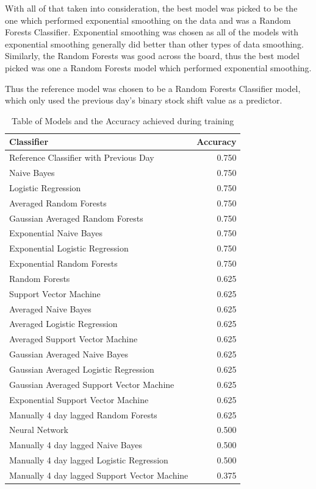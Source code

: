 With all of that taken into consideration, the best model was picked to be the one which performed exponential smoothing on the data and was a Random Forests Classifier. Exponential smoothing was chosen as all of the models with exponential smoothing generally did better than other types of data smoothing. Similarly, the Random Forests was good across the board, thus the best model picked was one a Random Forests model which performed exponential smoothing. 

Thus the reference model was chosen to be a Random Forests Classifier model, which only used the previous day's binary stock shift value as a predictor. 
\begin{table}[H]
	\centering 
\begin{tabular}{lr}

	Classifier &  Accuracy \\
	\hline
	Reference Classifier with Previous Day & 0.750\\
	\hline
                                  Naive Bayes &     0.750 \\
Logistic Regression &     0.750 \\
Averaged Random Forests &     0.750 \\
Gaussian Averaged Random Forests &     0.750 \\
Exponential Naive Bayes &     0.750 \\
Exponential Logistic Regression &     0.750 \\
Exponential Random Forests &     0.750 \\
Random Forests &     0.625 \\
Support Vector Machine &     0.625 \\
Averaged Naive Bayes &     0.625 \\
Averaged Logistic Regression &     0.625 \\
Averaged Support Vector Machine &     0.625 \\
Gaussian Averaged Naive Bayes &     0.625 \\
Gaussian Averaged Logistic Regression &     0.625 \\
Gaussian Averaged Support Vector Machine &     0.625 \\
Exponential Support Vector Machine &     0.625 \\
Manually 4 day lagged Random Forests &     0.625 \\
Neural Network & 0.500 \\
Manually 4 day lagged Naive Bayes &     0.500 \\
Manually 4 day lagged Logistic Regression &     0.500 \\
Manually 4 day lagged Support Vector Machine &     0.375 \\
	

\end{tabular}

	\caption{Table of Models and the Accuracy achieved during training}
		\label{table:modaccuracy}
\end{table}

